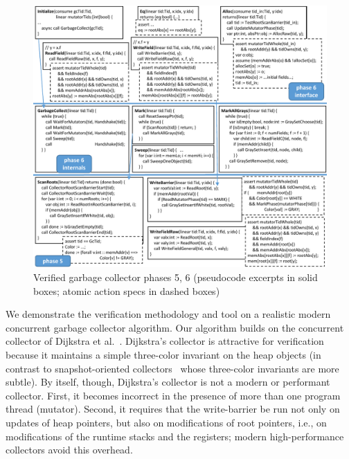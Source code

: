 \begin{figure}
\includegraphics[scale=1.0]{VerifiedGC.pdf}
\caption{Verified garbage collector phases 5, 6 (pseudocode excerpts in solid boxes; atomic action specs in dashed boxes)}
\label{fig:VerifiedGC}
\end{figure}

We demonstrate the verification methodology and tool on a realistic modern concurrent garbage collector algorithm.
Our algorithm builds on the concurrent collector of Dijkstra et al.~\cite{dijk78}.
Dijkstra's collector is attractive for verification because it maintains a simple three-color invariant
on the heap objects (in contrast to snapshot-oriented collectors~\cite{doli93,doli94,doma00,azat03}
whose three-color invariants are more subtle).
By itself, though, Dijkstra's collector is not a modern or performant collector.
First, it becomes incorrect in the presence of more than one program thread (mutator).
Second, it requires that the write-barrier be run not only on updates of heap pointers,
but also on modifications of root pointers, i.e., on modifications of the runtime stacks and the registers;
modern high-performance collectors avoid this overhead.

